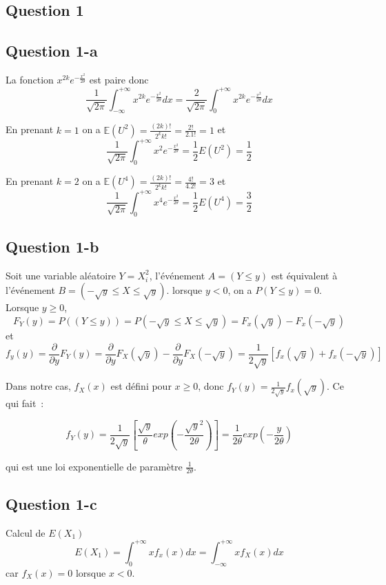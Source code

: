 \documentclass[]{book}
\theoremstyle{definition}
\begin{document}
\subsection*{Question 1}
\subsection*{Question 1-a}

La fonction $x^{2k}e^{-\frac{x^2}{2\theta}}$ est paire donc 
$$
\frac{1}{\sqrt{2\pi}} \int_{-\infty}^{+\infty} x^{2k}e^{-\frac{x^2}{2\theta}} dx = \frac{2}{\sqrt{2\pi}} \int_{0}^{+\infty} x^{2k}e^{-\frac{x^2}{2\theta}} dx
$$

En prenant $k=1$ on a $\mathbb{E}(U^{2}) = \frac{(2k)!}{2^kk!} = \frac{2!}{2.1!} = 1$ et 
$$
\frac{1}{\sqrt{2\pi}} \int_{0}^{+\infty} x^{2}e^{-\frac{x^2}{2\theta}} = \frac{1}{2} E(U^2) = \frac{1}{2}
$$

En prenant $k=2$ on a $\mathbb{E}(U^{4}) = \frac{(2k)!}{2^kk!} = \frac{4!}{4.2!} = 3$ et
$$
\frac{1}{\sqrt{2\pi}} \int_{0}^{+\infty} x^{4}e^{-\frac{x^2}{2\theta}} = \frac{1}{2} E(U^4) = \frac{3}{2}
$$


\subsection*{Question 1-b}
Soit une variable al\'eatoire $Y = X_i^2$, l'\'ev\'enement $A = (Y \leq y)$ est \'equivalent \`a l'\'ev\'enement $B = (-\sqrt{y} \leq X \leq \sqrt{y})$. lorsque $y < 0$, on a $P(Y \leq y)=0$.
Lorsque $y \geq 0$,
$$
F_{Y}(y) = P( (Y \leq y)) = P (-\sqrt{y} \leq X \leq \sqrt{y}) = F_{x}(\sqrt{y}) - F_{x}(-\sqrt{y})
$$
et
$$
f_{y}(y) = \frac{\partial}{\partial y} F_{Y}(y) = \frac{\partial}{\partial y} F_{X}(\sqrt{y}) - \frac{\partial}{\partial y} F_{X}(-\sqrt{y}) = \frac{1}{2\sqrt{y}}[f_{x}(\sqrt{y}) + f_{x}(-\sqrt{y})]
$$

Dans notre cas, $f_{X}(x)$ est d\'efini pour $x \geq 0$, donc $f_{Y}(y)=\frac{1}{2\sqrt{y}}f_{x}(\sqrt{y})$. Ce qui fait~:

$$
f_{Y}(y) = \frac{1}{2\sqrt{y}} \left[ \frac{\sqrt{y}}{\theta}exp \left( -\frac{\sqrt{y}^2}{2\theta} \right) \right] = \frac{1}{2\theta} exp \left( -\frac{y}{2\theta} \right)
$$

qui est une loi exponentielle de param\`etre $\frac{1}{2\theta}$.

\subsection*{Question 1-c}
Calcul de $E(X_1)$
$$
E(X_1) = \int_{0}^{+\infty} x f_{x}(x) dx = \int_{-\infty}^{+\infty} x f_{X}(x) dx
$$
car $f_{X}(x) = 0$ lorsque $x < 0$.
\end{document}
